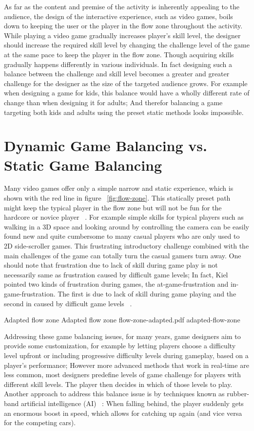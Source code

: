 As far as the content and premise of the activity is inherently appealing to the audience, the design of the interactive experience, such as video games, boils down to keeping the user or the player in the flow zone throughout the activity. While playing a video game gradually increases player's skill level, the designer should increase the required skill level by changing the challenge level of the game at the same pace to keep the player in the flow zone. Though acquiring skills gradually happens differently in various individuals. In fact designing such a balance between the challenge and skill level becomes a greater and greater challenge for the designer as the size of the targeted audience grows. For example when designing a game for kids, this balance would have a wholly different rate of change than when designing it for adults; And therefor balancing a game targeting both kids and adults using the preset static methods looks impossible.

\section{Dynamic Game Balancing vs. Static Game Balancing }

Many video games offer only a simple narrow and static experience, which is shown with the red line in figure ~\ref{fig:flow-zone}. This statically preset path might keep the typical player in the flow zone but will not be fun for the hardcore or novice player ~\cite{chen2007flow}. For example simple skills for typical players such as walking in a 3D space and looking around by controlling the camera can be easily found new and quite cumbersome to many casual players who are only used to 2D side-scroller games. This frustrating introductory challenge combined with the main challenges of the game can totally turn the casual gamers turn away. One should note that frustration due to lack of skill during game play is not necessarily same as frustration caused by difficult game levels; In fact, Kiel pointed two kinds of frustration during games, the at-game-frustration and in-game-frustration. The first is due to lack of skill during game playing and the second in caused by difficult game levels ~\cite{gilleade2004using}.

\img
{Adapted flow zone}
{Adapted flow zone}
{flow-zone-adapted.pdf}
{adapted-flow-zone}

Addressing these game balancing issues, for many years, game designers aim to provide some customization, for example by letting players choose a difficulty level upfront or including progressive difficulty levels during gameplay, based on a player's performance; However more advanced methods that work in real-time are less common, most designers predefine levels of game challenge for players with different skill levels. The player then decides in which of those levels to play. Another approach to address this balance issue is by techniques known as rubber-band artificial intelligence (AI) ~\cite{champandard2003ai}: When falling behind, the player suddenly gets an enormous boost in speed, which allows for catching up again (and vice versa for the competing cars).

